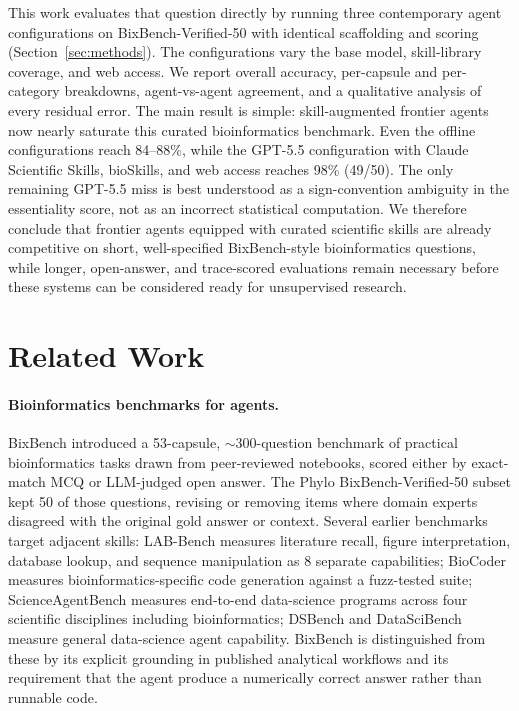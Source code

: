 \documentclass[11pt]{article}
\begin{document}
This work evaluates that question directly by running three contemporary
agent configurations on BixBench-Verified-50 with identical scaffolding
and scoring (Section~\ref{sec:methods}). The configurations vary the base
model, skill-library coverage, and web access. We report overall accuracy,
per-capsule and per-category breakdowns, agent-vs-agent agreement, and a
qualitative analysis of every residual error. The main result is simple:
skill-augmented frontier agents now nearly saturate this curated
bioinformatics benchmark. Even the offline configurations reach 84--88\%,
while the GPT-5.5 configuration with Claude Scientific Skills, bioSkills,
and web access reaches 98\% (49/50). The only remaining GPT-5.5 miss is
best understood as a sign-convention ambiguity in the essentiality score,
not as an incorrect statistical computation. We therefore conclude that
frontier agents equipped with curated scientific skills are already
competitive on short, well-specified BixBench-style bioinformatics
questions, while longer, open-answer, and trace-scored evaluations remain
necessary before these systems can be considered ready for unsupervised
research.

\section{Related Work}

\paragraph{Bioinformatics benchmarks for agents.}
BixBench \citep{mitchener2025bixbench} introduced a 53-capsule, $\sim$300-question
benchmark of practical bioinformatics tasks drawn from peer-reviewed
notebooks, scored either by exact-match MCQ or LLM-judged open answer.
The Phylo BixBench-Verified-50 subset \citep{phylo2026} kept 50 of those
questions, revising or removing items where domain experts disagreed
with the original gold answer or context. Several earlier benchmarks
target adjacent skills: LAB-Bench \citep{laurent2024labbench} measures
literature recall, figure interpretation, database lookup, and sequence
manipulation as 8 separate capabilities; BioCoder \citep{tang2024biocoder}
measures bioinformatics-specific code generation against a fuzz-tested
suite; ScienceAgentBench \citep{chen2024scienceagent} measures end-to-end
data-science programs across four scientific disciplines including
bioinformatics; DSBench \citep{jing2024dsbench} and DataSciBench
\citep{zhang2025datasci} measure general data-science agent capability.
BixBench is distinguished from these by its explicit grounding in
published analytical workflows and its requirement that the agent
produce a numerically correct answer rather than runnable code.
\end{document}
